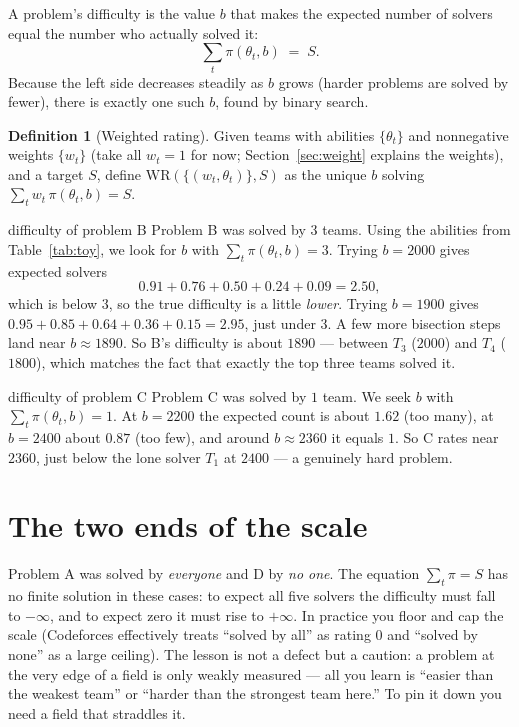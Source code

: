 \documentclass[11pt]{report}
\theoremstyle{definition}
\newtheorem{definition}{Definition}[chapter]
\numberwithin{equation}{chapter}
\begin{document}
\begin{keyidea}
A problem's difficulty is the value $b$ that makes the expected number of solvers
equal the number who actually solved it:
\[
  \sum_t \pi(\theta_t,b)\;=\;S.
\]
Because the left side decreases steadily as $b$ grows (harder problems are solved
by fewer), there is exactly one such $b$, found by binary search.
\end{keyidea}

\begin{definition}[Weighted rating]\label{def:wr}
Given teams with abilities $\{\theta_t\}$ and nonnegative weights $\{w_t\}$ (take
all $w_t=1$ for now; Section~\ref{sec:weight} explains the weights), and a target
$S$, define $\mathrm{WR}(\{(w_t,\theta_t)\},S)$ as the unique $b$ solving
$\sum_t w_t\,\pi(\theta_t,b)=S$.
\end{definition}

\begin{worked}{difficulty of problem B}
Problem B was solved by $3$ teams. Using the abilities from
Table~\ref{tab:toy}, we look for $b$ with $\sum_t\pi(\theta_t,b)=3$. Trying
$b=2000$ gives expected solvers
\[
  0.91+0.76+0.50+0.24+0.09 = 2.50,
\]
which is below $3$, so the true difficulty is a little \emph{lower}. Trying
$b=1900$ gives $0.95+0.85+0.64+0.36+0.15=2.95$, just under $3$. A few more
bisection steps land near $b\approx 1890$. So B's difficulty is about
$1890$ --- between $T_3$ ($2000$) and $T_4$ ($1800$), which matches the fact that
exactly the top three teams solved it.
\end{worked}

\begin{worked}{difficulty of problem C}
Problem C was solved by $1$ team. We seek $b$ with $\sum_t\pi(\theta_t,b)=1$.
At $b=2200$ the expected count is about $1.62$ (too many), at $b=2400$ about
$0.87$ (too few), and around $b\approx 2360$ it equals $1$. So C rates near
$2360$, just below the lone solver $T_1$ at $2400$ --- a genuinely hard problem.
\end{worked}

\section{The two ends of the scale}

Problem A was solved by \emph{everyone} and D by \emph{no one}. The equation
$\sum_t\pi=S$ has no finite solution in these cases: to expect all five solvers
the difficulty must fall to $-\infty$, and to expect zero it must rise to
$+\infty$. In practice you floor and cap the scale (Codeforces effectively treats
``solved by all'' as rating $0$ and ``solved by none'' as a large ceiling). The
lesson is not a defect but a caution: a problem at the very edge of a field is
only weakly measured --- all you learn is ``easier than the weakest team'' or
``harder than the strongest team here.'' To pin it down you need a field that
straddles it.
\end{document}
